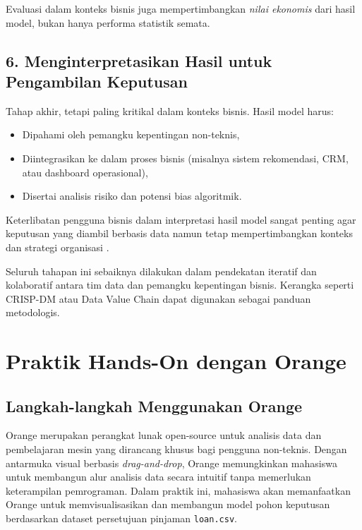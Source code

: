 Evaluasi dalam konteks bisnis juga mempertimbangkan \textit{nilai ekonomis} dari hasil model, bukan hanya performa statistik semata.

\subsection*{6. Menginterpretasikan Hasil untuk Pengambilan Keputusan}

Tahap akhir, tetapi paling kritikal dalam konteks bisnis. Hasil model harus:
\begin{itemize}
	\item Dipahami oleh pemangku kepentingan non-teknis,
	\item Diintegrasikan ke dalam proses bisnis (misalnya sistem rekomendasi, CRM, atau dashboard operasional),
	\item Disertai analisis risiko dan potensi bias algoritmik.
\end{itemize}

Keterlibatan pengguna bisnis dalam interpretasi hasil model sangat penting agar keputusan yang diambil berbasis data namun tetap mempertimbangkan konteks dan strategi organisasi \cite{provost2013data,davenport2018}.

\bigskip

\noindent
Seluruh tahapan ini sebaiknya dilakukan dalam pendekatan iteratif dan kolaboratif antara tim data dan pemangku kepentingan bisnis. Kerangka seperti CRISP-DM atau Data Value Chain dapat digunakan sebagai panduan metodologis.



\section{Praktik Hands-On dengan Orange}

\subsection{Langkah-langkah Menggunakan Orange}

Orange merupakan perangkat lunak open-source untuk analisis data dan pembelajaran mesin yang dirancang khusus bagi pengguna non-teknis. Dengan antarmuka visual berbasis \textit{drag-and-drop}, Orange memungkinkan mahasiswa untuk membangun alur analisis data secara intuitif tanpa memerlukan keterampilan pemrograman. Dalam praktik ini, mahasiswa akan memanfaatkan Orange untuk memvisualisasikan dan membangun model pohon keputusan berdasarkan dataset persetujuan pinjaman \texttt{loan.csv}.

